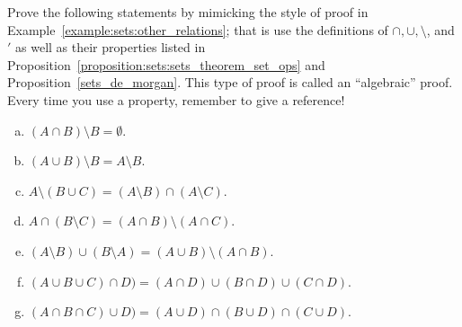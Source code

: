  
 
 
 
 

 
 
\begin{exercise}{30}
Prove the following statements by mimicking the style of proof in Example~\ref{example:sets:other_relations}; that is use the definitions of $\cap, \cup, \setminus$, and $'$ as well as their properties listed in Proposition~\ref{proposition:sets:sets_theorem_set_ops} and  Proposition~\ref{sets_de_morgan}. This type of proof is called an ``algebraic'' proof.  Every time you use a property, remember to give a reference!
\begin{enumerate}[(a)]
\item
$(A \cap B) \setminus B = \emptyset$.
\item
$(A \cup B) \setminus B = A \setminus B$.
\item
$A \setminus (B \cup C) = (A \setminus B) \cap (A \setminus C)$. 
\item
 $A \cap (B \setminus C) = (A \cap B) \setminus (A \cap C)$. 
\item
$(A \setminus B) \cup (B \setminus A) = (A \cup B) \setminus (A \cap B)$. 
\item
$(A \cup B \cup C) \cap D) = (A \cap D) \cup (B \cap D)\cup (C \cap D)$. 
\item
$(A \cap B \cap C) \cup D) = (A \cup D) \cap (B \cup D)\cap (C \cup D)$. 
\end{enumerate}
\end{exercise}

